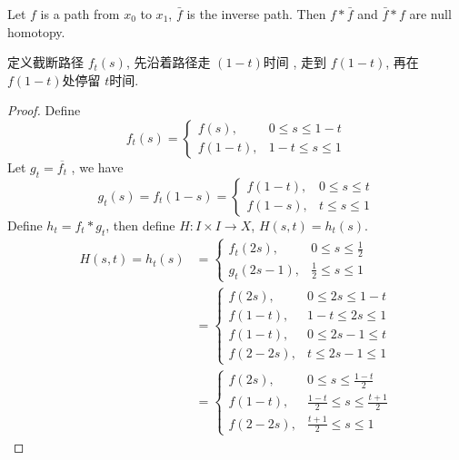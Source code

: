 \documentclass[../main.tex]{subfiles}
\begin{document}
\begin{proposition}{}{}
    Let \(  f  \) is a path from \(  x_0  \) to \(  x_1  \), \(  \bar{f}  \) is the  inverse path.    Then \(  f* \bar{f}  \) and \(  \bar{f}*f  \) are null homotopy.  
\end{proposition}

\begin{proofsketch}
    定义截断路径 \(  f_{t}\left( s \right)   \), 先沿着路径走 \(  \left( 1-t \right)   \)时间 , 走到 \(  f\left( 1-t \right)   \),  再在 \( f\left( 1-t \right)  \)处停留 \(  t  \)时间.    
\end{proofsketch}

\begin{proof}
     Define \[
     f_{t}\left( s \right)= \begin{cases} f\left( s \right),& 0\le s\le 1-t\\ 
      f\left( 1-t \right),& 1-t\le s\le 1   \end{cases}  
     \] Let \(  g_{t} = \overline{f_{t}}  \) , we have \[
     g_{t}\left( s \right)= f_{t}\left( 1-s \right)= \begin{cases} f\left( 1-t\right),& 0\le  s\le t \\ 
      f\left( 1-s \right),& t\le s\le 1  \end{cases}   
     \]  Define \(  h_{t}= f_{t}*g_{t}  \), then define \(  H: I\times I\to X  \),  \(  H\left( s,t \right)= h_{t}\left( s \right)    \).    \[
   \begin{aligned}
     H\left( s,t \right)= h_{t}\left( s \right)&= \begin{cases} f_{t}\left( 2s \right),& 0\le s\le \frac{1}{2}\\ 
      g_{t}\left( 2s-1 \right),& \frac{1}{2}\le s\le 1   \end{cases}  \\ 
       &= \begin{cases} f\left( 2s \right),& 0\le 2s\le 1-t \\ 
        f\left( 1-t \right),& 1-t\le 2s\le 1 \\ 
         f\left( 1-t \right),& 0\le 2s-1\le t\\ 
          f\left( 2-2s\right),& t\le 2s-1\le 1   \end{cases} \\ 
           &= \begin{cases} f\left( 2s \right),&0\le s\le \frac{1-t }{2 }\\ 
            f\left( 1-t \right),& \frac{1-t }{2 }\le s\le \frac{t+ 1 }{2 }\\ 
             f\left( 2-2s \right),&\frac{t+ 1 }{2 }\le s\le 1        \end{cases} 
   \end{aligned}  
     \]


\end{proof}
\end{document}
